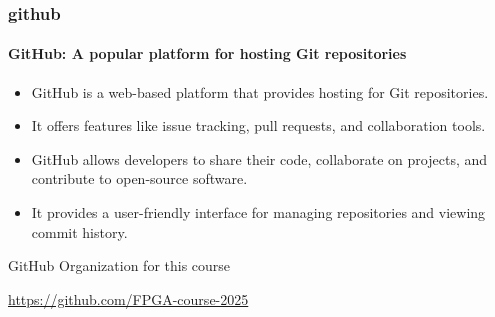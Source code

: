\documentclass{beamer}
\begin{document}
\begin{frame}\frametitle{github}\framesubtitle{GitHub: A popular platform for hosting Git repositories}
\begin{itemize}
	\item GitHub is a web-based platform that provides hosting for Git repositories.
	\item It offers features like issue tracking, pull requests, and collaboration tools.
	\item GitHub allows developers to share their code, collaborate on projects, and contribute to open-source software.
	\item It provides a user-friendly interface for managing repositories and viewing commit history.
\end{itemize}

\begin{alertblock}{GitHub Organization for this course}
\begin{center}
\url{https://github.com/FPGA-course-2025}
\end{center}
\end{alertblock}
\end{frame}
\end{document}
